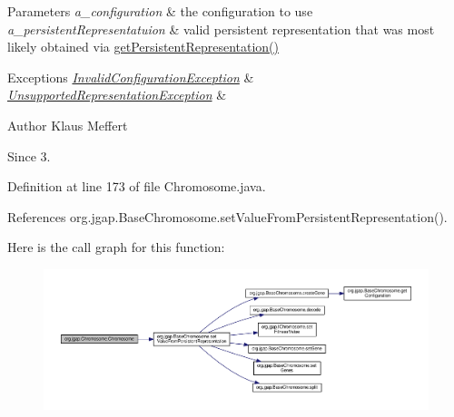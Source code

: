 \begin{DoxyParams}{Parameters}
{\em a\-\_\-configuration} & the configuration to use \\
\hline
{\em a\-\_\-persistent\-Representatuion} & valid persistent representation that was most likely obtained via \hyperlink{classorg_1_1jgap_1_1_base_chromosome_ab4a4ad55945458548488f87940aa852e}{get\-Persistent\-Representation()} \\
\hline
\end{DoxyParams}

\begin{DoxyExceptions}{Exceptions}
{\em \hyperlink{classorg_1_1jgap_1_1_invalid_configuration_exception}{Invalid\-Configuration\-Exception}} & \\
\hline
{\em \hyperlink{classorg_1_1jgap_1_1_unsupported_representation_exception}{Unsupported\-Representation\-Exception}} & \\
\hline
\end{DoxyExceptions}
\begin{DoxyAuthor}{Author}
Klaus Meffert 
\end{DoxyAuthor}
\begin{DoxySince}{Since}
3. 
\end{DoxySince}


Definition at line 173 of file Chromosome.\-java.



References org.\-jgap.\-Base\-Chromosome.\-set\-Value\-From\-Persistent\-Representation().



Here is the call graph for this function\-:
\nopagebreak
\begin{figure}[H]
\begin{center}
\leavevmode
\includegraphics[width=350pt]{classorg_1_1jgap_1_1_chromosome_a7290755db8269b79ebdb00b0cd0a9935_cgraph}
\end{center}
\end{figure}



